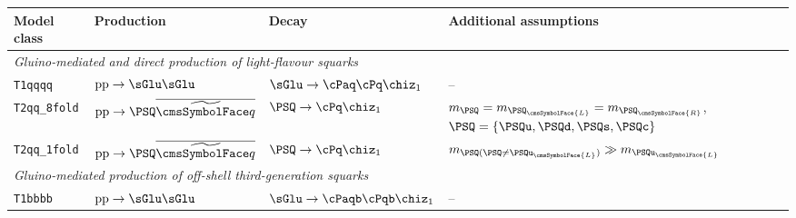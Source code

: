 \begin{table}[!t]
  \label{tab:simplified-models}
  \centering
  \footnotesize
  \begin{tabular}{ llll }
    \hline
Model class               %
                                & Production
                                & Decay
                                & Additional assumptions                                                         \\ [0.5ex]
\hline
\multicolumn{4}{l}{\it Gluino-mediated and direct production of light-flavour squarks}                           \\ [0.5ex]
\texttt{T1qqqq}        %
                                & $\text{pp}\ra\sGlu\sGlu$
                                & $\sGlu\ra\cPaq\cPq\chiz_1$
                                & --                                                                             \\ [0.5ex]
\texttt{T2qq\_8fold}   %
                                & $\text{pp}\ra\PSQ\PASQ$        
                                & $\PSQ\ra\cPq\chiz_1$
                                & $m_{\PSQ} = m_{\PSQ_\cmsSymbolFace{L}} = m_{\PSQ_\cmsSymbolFace{R}}$,
                       $\PSQ = \{ \PSQu, \PSQd, \PSQs, \PSQc \}$                                                 \\ [0.5ex]
\texttt{T2qq\_1fold}   %
                                & $\text{pp}\ra\PSQ\PASQ$         
                                & $\PSQ\ra\cPq\chiz_1$
                                & $m_{\PSQ (\PSQ \neq \PSQu_\cmsSymbolFace{L})} \gg m_{\PSQu_\cmsSymbolFace{L}}$ \\ [0.5ex]
\multicolumn{4}{l}{\it Gluino-mediated production of off-shell third-generation squarks}                         \\ [0.5ex]
\texttt{T1bbbb}        %
                                & $\text{pp}\ra\sGlu\sGlu$       
                                & $\sGlu\ra\cPaqb\cPqb\chiz_1$
                                & --                                                                             \\ [0.5ex]

\end{tabular}
\end{table}
